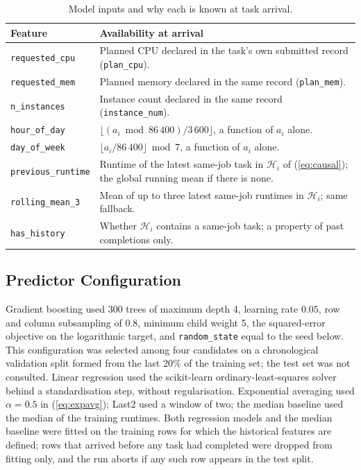 \documentclass[conference]{IEEEtran}
\begin{document}
\begin{table}[t]
  \caption{Model inputs and why each is known at task arrival.}
  \label{tab:features}
  \centering
  \begin{tabular}{lp{}}
    \toprule
    Feature & Availability at arrival \\
    \midrule
    \texttt{requested\_cpu} & Planned CPU declared in the task's own submitted record (\texttt{plan\_cpu}). \\
    \texttt{requested\_mem} & Planned memory declared in the same record (\texttt{plan\_mem}). \\
    \texttt{n\_instances} & Instance count declared in the same record (\texttt{instance\_num}). \\
    \texttt{hour\_of\_day} & $\lfloor (a_i \bmod 86\,400) / 3\,600 \rfloor$, a function of $a_i$ alone. \\
    \texttt{day\_of\_week} & $\lfloor a_i / 86\,400 \rfloor \bmod 7$, a function of $a_i$ alone. \\
    \texttt{previous\_runtime} & Runtime of the latest same-job task in $\mathcal{H}_i$ of (\ref{eq:causal}); the global running mean if there is none. \\
    \texttt{rolling\_mean\_3} & Mean of up to three latest same-job runtimes in $\mathcal{H}_i$; same fallback. \\
    \texttt{has\_history} & Whether $\mathcal{H}_i$ contains a same-job task; a property of past completions only. \\
    \bottomrule
  \end{tabular}
\end{table}

\subsection{Predictor Configuration}
Gradient boosting used 300 trees of maximum depth 4, learning rate 0.05, row
and column subsampling of 0.8, minimum child weight 5, the squared-error
objective on the logarithmic target, and \texttt{random\_state} equal to the
seed below. This configuration was selected among four candidates on a
chronological validation split formed from the last 20\% of the training
set; the test set was not consulted. Linear regression used the
scikit-learn ordinary-least-squares solver~\cite{pedregosa_scikit_2011}
behind a standardisation step, without
regularisation. Exponential averaging used $\alpha = 0.5$ in
(\ref{eq:expavg}); Last2 used a window of two; the median baseline used the
median of the training runtimes. Both regression models and the median
baseline were fitted on the training rows for which the historical features
are defined; rows that arrived before any task had completed were dropped
from fitting only, and the run aborts if any such row appears in the test
split.
\end{document}
